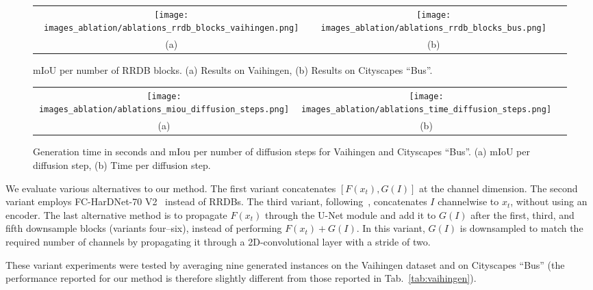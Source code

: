 \documentclass[10pt,twocolumn,letterpaper]{article}
\begin{document}
\begin{figure*}[t]
\centering
\begin{tabular}{@{}c@{~}c@{~}c@{}}
    \texttt{[image: images\_ablation/ablations\_rrdb\_blocks\_vaihingen.png]} & 
    \texttt{[image: images\_ablation/ablations\_rrdb\_blocks\_bus.png]} \\
    (a) & (b)
\end{tabular}

\caption{mIoU per number of RRDB blocks. (a) Results on Vaihingen, (b) Results on Cityscapes ``Bus''.}

\label{fig:iou_per_rrdb_blocks}
\end{figure*}

\begin{figure*}[t]
\centering
\begin{tabular}{@{}c@{~}c@{~}c@{}}
    \texttt{[image: images\_ablation/ablations\_miou\_diffusion\_steps.png]} & 
    \texttt{[image: images\_ablation/ablations\_time\_diffusion\_steps.png]} 
    \\
    (a) & (b)
\end{tabular}
\caption{Generation time in seconds and mIou per number of diffusion steps for Vaihingen and Cityscapes ``Bus''. (a) mIoU per diffusion step, (b) Time per diffusion step.}
\label{fig:time_and_iou_per_steps}
\end{figure*}

We evaluate various alternatives to our method. The first variant concatenates $[F(x_t),G(I)]$ at the channel dimension. The second variant employs FC-HarDNet-70 V2~\cite{chao2019hardnet} instead of RRDBs.
The third variant, following~\cite{saharia2021image,ho2022cascaded}, concatenates $I$ channelwise to $x_t$, without using an encoder. The last alternative method is to propagate $F(x_t)$ through the U-Net module and add it to $G(I)$ after the first, third, and fifth downsample blocks (variants four--six), instead of performing $F(x_t) + G(I)$. In this variant, $G(I)$ is downsampled to match the required number of channels by propagating it through a 2D-convolutional layer with a stride of two.

These variant experiments were tested by averaging nine generated instances on the Vaihingen dataset and on Cityscapes ``Bus'' (the performance reported for our method is therefore slightly different from those reported in Tab.~\ref{tab:vaihingen}).
\end{document}
